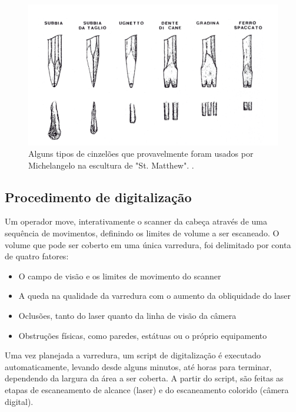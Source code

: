 
\begin{figure}[!h]
	\centering
	\includegraphics[width=0.5\linewidth]{figs/ferramentasMich.png}
	\caption{%
	Alguns tipos de cinzelões que provavelmente foram usados por Michelangelo na escultura de "St. Matthew".
	\protect\cite{levoy2000digital}.
	}\label{fig:noite}
\end{figure}

\subsection*{Procedimento de digitalização}

Um operador move, interativamente o scanner da cabeça através de uma sequência de movimentos, definindo os limites de volume a ser escaneado. O volume que pode ser coberto em uma única varredura, foi delimitado por conta de quatro fatores:
\begin{itemize}
\item{O campo de visão e os limites de movimento do scanner}
\item{A  queda na qualidade da varredura com o aumento da obliquidade do laser}
\item{Oclusões, tanto do laser quanto da linha de visão da câmera}
\item{Obstruções físicas, como paredes, estátuas ou o próprio equipamento}
\end{itemize}

Uma vez planejada a varredura, um script de digitalização é executado automaticamente, levando desde alguns minutos, até horas para terminar, dependendo da largura da área a ser coberta.
A partir do script, são feitas as etapas de escaneamento de alcance (laser) e do escaneamento colorido (câmera digital).

